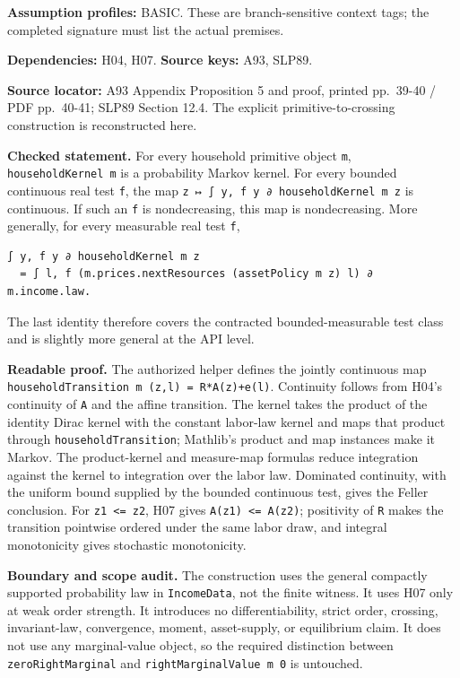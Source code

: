 \documentclass[
  11pt,
]{article}
\let\LedgerOriginalTexttt\texttt
\renewcommand{\texttt}[1]{{\small\LedgerOriginalTexttt{#1}}}
\begin{document}
\textbf{Assumption profiles:} BASIC. These are branch-sensitive context
tags; the completed signature must list the actual premises.

\textbf{Dependencies:} H04, H07. \textbf{Source keys:} A93, SLP89.

\textbf{Source locator:} A93 Appendix Proposition 5 and proof, printed
pp.~39-40 / PDF pp.~40-41; SLP89 Section 12.4. The explicit
primitive-to-crossing construction is reconstructed here.

\textbf{Checked statement.} For every household primitive object
\texttt{m}, \texttt{householdKernel\ m} is a probability Markov kernel.
For every bounded continuous real test \texttt{f}, the map
\texttt{z\ ↦\ ∫\ y,\ f\ y\ ∂\ householdKernel\ m\ z} is continuous. If
such an \texttt{f} is nondecreasing, this map is nondecreasing. More
generally, for every measurable real test \texttt{f},

\begin{verbatim}
∫ y, f y ∂ householdKernel m z
  = ∫ l, f (m.prices.nextResources (assetPolicy m z) l) ∂ m.income.law.
\end{verbatim}

The last identity therefore covers the contracted bounded-measurable
test class and is slightly more general at the API level.

\textbf{Readable proof.} The authorized helper defines the jointly
continuous map \texttt{householdTransition\ m\ (z,l)\ =\ R*A(z)+e(l)}.
Continuity follows from H04's continuity of \texttt{A} and the affine
transition. The kernel takes the product of the identity Dirac kernel
with the constant labor-law kernel and maps that product through
\texttt{householdTransition}; Mathlib's product and map instances make
it Markov. The product-kernel and measure-map formulas reduce
integration against the kernel to integration over the labor law.
Dominated continuity, with the uniform bound supplied by the bounded
continuous test, gives the Feller conclusion. For
\texttt{z1\ \textless{}=\ z2}, H07 gives
\texttt{A(z1)\ \textless{}=\ A(z2)}; positivity of \texttt{R} makes the
transition pointwise ordered under the same labor draw, and integral
monotonicity gives stochastic monotonicity.

\textbf{Boundary and scope audit.} The construction uses the general
compactly supported probability law in \texttt{IncomeData}, not the
finite witness. It uses H07 only at weak order strength. It introduces
no differentiability, strict order, crossing, invariant-law,
convergence, moment, asset-supply, or equilibrium claim. It does not use
any marginal-value object, so the required distinction between
\texttt{zeroRightMarginal} and \texttt{rightMarginalValue\ m\ 0} is
untouched.
\end{document}

